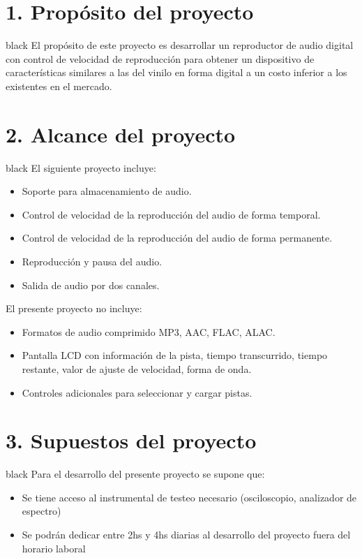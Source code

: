\documentclass[11pt]{charter}
\begin{document}
\section{1. Propósito del proyecto}
\label{sec:proposito}

\begin{consigna}{black}
El propósito de este proyecto es desarrollar un reproductor de audio digital con control de velocidad de reproducción para obtener un dispositivo de características similares a las del vinilo en forma digital a un costo inferior a los existentes en el mercado. 
\end{consigna}

\section{2. Alcance del proyecto}
\label{sec:alcance}

\begin{consigna}{black}
El siguiente proyecto incluye:
\begin{itemize}
\item Soporte para almacenamiento de audio.
\item Control de velocidad de la reproducción del audio de forma temporal.
\item Control de velocidad de la reproducción del audio de forma permanente.
\item Reproducción y pausa del audio.
\item Salida de audio por dos canales.
\end{itemize}

El presente proyecto no incluye:
\begin{itemize}
\item Formatos de audio comprimido MP3, AAC, FLAC, ALAC.
\item Pantalla LCD con información de la pista, tiempo transcurrido, tiempo restante, valor de ajuste de velocidad, forma de onda.
\item Controles adicionales para seleccionar y cargar pistas.
\end{itemize}
\end{consigna}

\section{3. Supuestos del proyecto}
\label{sec:supuestos}

\begin{consigna}{black}
Para el desarrollo del presente proyecto se supone que:

\begin{itemize}
\item Se tiene acceso al instrumental de testeo necesario (osciloscopio, analizador de espectro)
\item Se podrán dedicar entre 2hs y 4hs diarias al desarrollo del proyecto fuera del horario laboral
\end{itemize}
\end{consigna}
\end{document}

